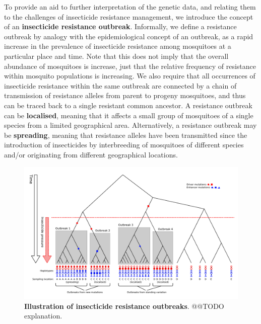 \documentclass[a4paper,11pt,abstracton,hidelinks]{scrartcl}
\begin{document}
%
To provide an aid to further interpretation of the genetic data, and relating them to the challenges of insecticide resistance management, we introduce the concept of an \textbf{insecticide resistance outbreak}.
%
Informally, we define a resistance outbreak by analogy with the epidemiological concept of an outbreak, as a rapid increase in the prevalence of insecticide resistance among mosquitoes at a particular place and time.
%
Note that this does not imply that the overall abundance of mosquitoes is increase, just that the relative frequency of resistance within mosquito populations is increasing.
%
We also require that all occurrences of insecticide resistance within the same outbreak are connected by a chain of transmission of resistance alleles from parent to progeny mosquitoes, and thus can be traced back to a single resistant common ancestor.
%
A resistance outbreak can be \textbf{localised}, meaning that it affects a small group of mosquitoes of a single species from a limited geographical area.
%
Alternatively, a resistance outbreak may be \textbf{spreading}, meaning that resistance alleles have been transmitted since the introduction of insecticides by interbreeding of mosquitoes of different species and/or originating from different geographical locations.
%


%
\begin{figure}[!b]
  \includegraphics[width=1.1\linewidth,center]{artwork/outbreaks.pdf}
  \caption{\textbf{Illustration of insecticide resistance outbreaks}. @@TODO explanation.}
  \label{fig:outbreaks}
\end{figure}
\end{document}
